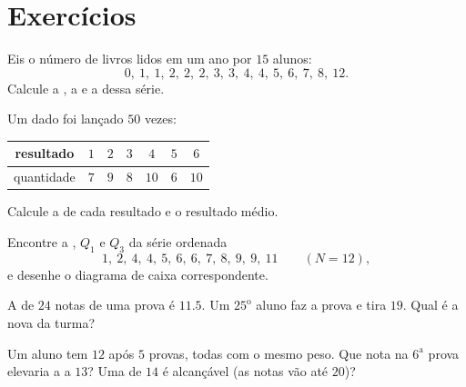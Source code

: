 \section{Exercícios}

\begin{exercise}[$\star$]\label{exo:g10:stats:1}
Eis o número de livros lidos em um ano por $15$ alunos:
\[
0,\ 1,\ 1,\ 2,\ 2,\ 2,\ 3,\ 3,\ 4,\ 4,\ 5,\ 6,\ 7,\ 8,\ 12 .
\]
Calcule a , a  e a  dessa série.
\end{exercise}

\begin{exercise}[$\star$]\label{exo:g10:stats:2}
Um dado foi lançado $50$ vezes:
\begin{center}
\renewcommand{\arraystretch}{1.2}
\begin{tabular}{c|cccccc}
resultado & $1$ & $2$ & $3$ & $4$ & $5$ & $6$ \\
\hline
quantidade & $7$ & $9$ & $8$ & $10$ & $6$ & $10$ \\
\end{tabular}
\end{center}
Calcule a  de cada resultado e o resultado médio.
\end{exercise}

\begin{exercise}[$\star$]\label{exo:g10:stats:3}
Encontre a , $Q_1$ e $Q_3$ da série ordenada
\[
1,\ 2,\ 4,\ 4,\ 5,\ 6,\ 6,\ 7,\ 8,\ 9,\ 9,\ 11 \qquad (N = 12),
\]
e desenhe o diagrama de caixa correspondente.
\end{exercise}

\begin{exercise}[$\star$]\label{exo:g10:stats:4}
A  de $24$ notas de uma prova é $11.5$. Um $25^{\text{o}}$ aluno faz
a prova e tira $19$. Qual é a nova  da turma?
\end{exercise}

\begin{exercise}[$\star\star$]\label{exo:g10:stats:5}
Um aluno tem  $12$ após $5$ provas, todas com o mesmo peso. Que nota
na $6^{\text{a}}$ prova elevaria a  a $13$? Uma  de $14$ é
alcançável (as notas vão até $20$)?
\end{exercise}

